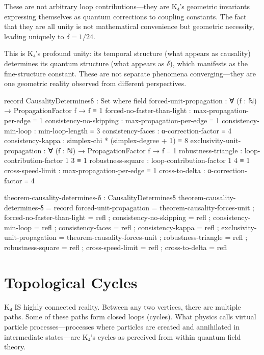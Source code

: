 \documentclass[11pt,a4paper]{book}
\begin{document}
These are not arbitrary loop contributions—they are K₄'s geometric invariants expressing themselves as quantum corrections to coupling constants. The fact that they are all unity is not mathematical convenience but geometric necessity, leading uniquely to $\delta = 1/24$.

This is K₄'s profound unity: its temporal structure (what appears as causality) determines its quantum structure (what appears as $\delta$), which manifests as the fine-structure constant. These are not separate phenomena converging—they are one geometric reality observed from different perspectives.

\begin{code}
record CausalityDeterminesδ : Set where
  field
    forced-unit-propagation    : ∀ (f : ℕ) → PropagationFactor f → f ≡ 1
    forced-no-faster-than-light : max-propagation-per-edge ≡ 1
    consistency-no-skipping    : max-propagation-per-edge ≡ 1
    consistency-min-loop       : min-loop-length ≡ 3
    consistency-faces          : α-correction-factor ≡ 4
    consistency-kappa          : simplex-chi * (simplex-degree + 1) ≡ 8
    exclusivity-unit-propagation : ∀ (f : ℕ) → PropagationFactor f → f ≡ 1
    robustness-triangle : loop-contribution-factor 1 3 ≡ 1
    robustness-square   : loop-contribution-factor 1 4 ≡ 1
    cross-speed-limit   : max-propagation-per-edge ≡ 1
    cross-to-delta      : α-correction-factor ≡ 4

theorem-causality-determines-δ : CausalityDeterminesδ
theorem-causality-determines-δ = record
  { forced-unit-propagation = theorem-causality-forces-unit
  ; forced-no-faster-than-light = refl
  ; consistency-no-skipping = refl
  ; consistency-min-loop = refl
  ; consistency-faces = refl
  ; consistency-kappa = refl
  ; exclusivity-unit-propagation = theorem-causality-forces-unit
  ; robustness-triangle = refl
  ; robustness-square = refl
  ; cross-speed-limit = refl
  ; cross-to-delta = refl
  }
\end{code}

\chapter{Topological Cycles}

K₄ IS highly connected reality. Between any two vertices, there are multiple paths. 
Some of these paths form closed loops (cycles). What physics calls virtual particle 
processes—processes where particles are created and annihilated in intermediate 
states—are K₄'s cycles as perceived from within quantum field theory.
\end{document}
